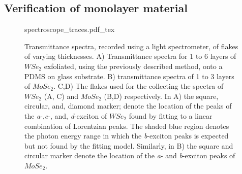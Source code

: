 \subsection{Verification of monolayer material}
\begin{figure}[h]
	\centering
	\def\svgwidth{1\linewidth}
	{spectroscope_traces.pdf_tex}
	\caption{Transmittance spectra, recorded using a light spectrometer, of flakes of varying thicknesses. A) Transmittance spectra for 1 to 6 layers of $WSe_2$ exfoliated, using the previously described method, onto a PDMS on glass substrate. B) transmittance spectra of 1 to 3 layers of $MoSe_2$. C,D) The flakes used for the collecting the spectra of $WSe_2$ (A, C) and $MoSe_2$ (B,D) respectively.
    In A) the square, circular, and, diamond marker; denote the location of the peaks of the \textit{a}-,\textit{c}-, and, \textit{d}-exciton of $WSe_2$ found by fitting to a linear combination of Lorentzian peaks. The shaded blue region denotes the photon energy range in which the \textit{b}-exciton peaks is expected but not found by the fitting model.
Similarly, in B) the square and circular marker denote the location of the \textit{a}- and \textit{b}-exciton peaks of $MoSe_2$.}
	\label{fig:spectroscope_traces}
\end{figure}

